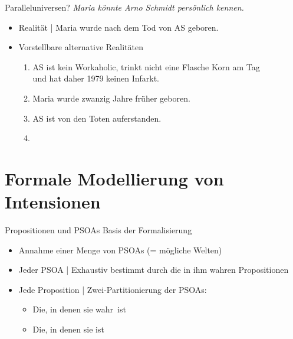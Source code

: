\begin{frame}
  {Paralleluniversen?}
  \onslide<+->
  \onslide<+->
  \alert{\textit{Maria könnte Arno Schmidt persönlich kennen.}}\\
  \Zeile
  \begin{itemize}[<+->]
    \item Realität | Maria wurde nach dem Tod von AS geboren.
      \Halbzeile
    \item Vorstellbare alternative Realitäten
      \begin{enumerate}[<+->]
        \item AS ist kein Workaholic, trinkt nicht eine Flasche Korn am Tag\\
          und hat daher 1979 keinen Infarkt.
        \item Maria wurde zwanzig Jahre früher geboren.
        \item AS ist von den Toten auferstanden.
        \item {}
      \end{enumerate}
  \end{itemize}
\end{frame}

\section{Formale Modellierung von Intensionen}

\begin{frame}
  {Propositionen und PSOAs}
  \onslide<+->
  \onslide<+->
  Basis der Formalisierung\\
  \Halbzeile
  \begin{itemize}[<+->]
    \item Annahme einer \alert{Menge von PSOAs} (= mögliche Welten)
      \Halbzeile
    \item Jeder PSOA | Exhaustiv bestimmt durch die in ihm wahren Propositionen
      \Halbzeile
    \item Jede Proposition | Zwei-Partitionierung der PSOAs:
      \begin{itemize}[<+->]
        \item Die, in denen sie \alert{wahr} ist
        \item Die, in denen sie  ist
      \end{itemize}
  \end{itemize}
\end{frame}

